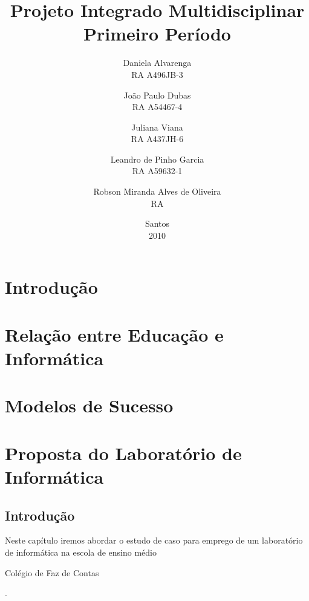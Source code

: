 \documentclass[a4paper,12pt]{report}
\begin{document}
    \author{Daniela Alvarenga                   \\RA A496JB-3
        \and João Paulo Dubas                   \\RA A54467-4
        \and Juliana Viana                      \\RA A437JH-6
        \and Leandro de Pinho Garcia            \\RA A59632-1
        \and Robson Miranda Alves de Oliveira   \\RA}
    \title{Projeto Integrado Multidisciplinar\\Primeiro Período}
    \date{Santos\\2010}

    \maketitle

    \tableofcontents

    \chapter{Introdução}
    \label{ch:intro}

    \chapter[Educação versus Informática]{Relação entre Educação e Informática}
    \label{ch:edu_x_info}

    \chapter{Modelos de Sucesso}
    \label{ch:modelo_sucesso}

    \chapter[Laboratório]{Proposta do Laboratório de Informática}
    \label{ch:laboratorio}

        \section{Introdução}
        \label{sc:laboratorio_intro}
        Neste capítulo iremos abordar o estudo de caso para emprego de um
        laboratório de informática na escola de ensino médio
        \begin{bfseries}Colégio de Faz de Contas\end{bfseries}.
\end{document}
